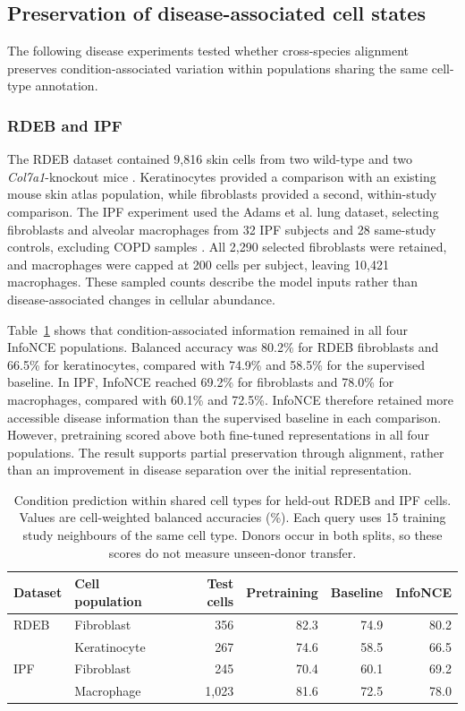 \documentclass{article}
\begin{document}
\subsection{Preservation of disease-associated cell states}
\label{sec:disease-state-results}
The following disease experiments tested whether cross-species alignment preserves condition-associated variation within populations sharing the same cell-type annotation.
\subsubsection{RDEB and IPF}
The RDEB dataset contained 9,816 skin cells from two wild-type and two \textit{Col7a1}-knockout mice \cite{RDEB2023}. Keratinocytes provided a comparison with an existing mouse skin atlas population, while fibroblasts provided a second, within-study comparison. The IPF experiment used the Adams et al. lung dataset, selecting fibroblasts and alveolar macrophages from 32 IPF subjects and 28 same-study controls, excluding COPD samples \cite{AdamsIPF2020}. All 2,290 selected fibroblasts were retained, and macrophages were capped at 200 cells per subject, leaving 10,421 macrophages. These sampled counts describe the model inputs rather than disease-associated changes in cellular abundance.

Table~\ref{tab:disease-cell-holdout} shows that condition-associated information remained in all four InfoNCE populations. Balanced accuracy was 80.2\% for RDEB fibroblasts and 66.5\% for keratinocytes, compared with 74.9\% and 58.5\% for the supervised baseline. In IPF, InfoNCE reached 69.2\% for fibroblasts and 78.0\% for macrophages, compared with 60.1\% and 72.5\%. InfoNCE therefore retained more accessible disease information than the supervised baseline in each comparison. However, pretraining scored above both fine-tuned representations in all four populations. The result supports partial preservation through alignment, rather than an improvement in disease separation over the initial representation.

\begin{table}[t]
    \centering
    \caption{Condition prediction within shared cell types for held-out RDEB and IPF cells. Values are cell-weighted balanced accuracies (\%). Each query uses 15 training study neighbours of the same cell type. Donors occur in both splits, so these scores do not measure unseen-donor transfer.}
    \label{tab:disease-cell-holdout}
    \small
    \setlength{\tabcolsep}{5pt}
    \begin{tabular*}{\textwidth}{@{\extracolsep{\fill}}llrrrr@{}}
        \hline
        Dataset & Cell population & Test cells & Pretraining & Baseline & InfoNCE \\
        \hline
        RDEB & Fibroblast    & 356   & 82.3 & 74.9 & 80.2 \\
             & Keratinocyte & 267   & 74.6 & 58.5 & 66.5 \\
        IPF  & Fibroblast   & 245   & 70.4 & 60.1 & 69.2 \\
             & Macrophage   & 1,023 & 81.6 & 72.5 & 78.0 \\
        \hline
    \end{tabular*}
\end{table}
\end{document}
